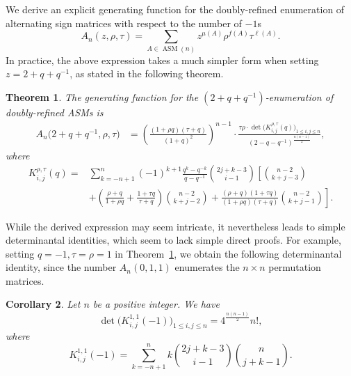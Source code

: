 \documentclass[12pt, a4paper]{amsart} %
\numberwithin{equation}{section}
\newtheorem{theorem}{Theorem}[section]
\newtheorem{corollary}[theorem]{Corollary}
\DeclareMathOperator{\ASM}{ASM}
\begin{document}
\medskip

We  derive an explicit  generating function for the doubly-refined enumeration of alternating sign matrices with respect to the number of $-1$s
\begin{equation}\label{def:An}
A_n(z,\rho,\tau) = \sum_{A\in \ASM(n)} z^{\mu(A)} \rho^{f(A)} \tau^{\ell(A)}.
\end{equation}
In practice, the above expression takes a much simpler form when setting $z=2+q+q^{-1}$, as stated in the following theorem.
\begin{theorem}\label{th:main}
The generating function  for 
the $(2+q+q^{-1})$-enumeration of doubly-refined ASMs is
\begin{align}\label{eq:An:main}
    A_n\bigl(2+q + q^{-1}, \rho, \tau\bigr)
        &= \left( \frac{(1 + \rho q)(\tau + q)}{(1 + q)^2} \right)^{\!n - 1} 
					 \cdot \frac{\tau \rho \cdot \det{\bigl(K^{\rho,\tau}_{i,j}(q)\bigr)_{1 \le i,j \le n}}}{(2 - q - q^{-1})^{\frac{n(n - 1)}{2}}},
\end{align}
    where
\begin{align*}
	K^{\rho,\tau}_{i,j}(q) = &\sum_{k=-n+1}^{n} (-1)^{k+1} \frac{q^k - q^{-k}}{q - q^{-1}} 
    \binom{2j + k - 3}{i - 1} \left[ \binom{n - 2}{k + j - 3} \right.  \\
    & \left. + \left( \frac{\rho + q}{1 + \rho q} + \frac{1 + \tau q}{\tau + q} \right) \binom{n - 2}{k + j - 2} 
     + \frac{(\rho + q)(1 + \tau q)}{(1 + \rho q)(\tau + q)} \binom{n - 2}{k + j - 1} \right].
\end{align*}      
    
\end{theorem}

While the derived expression may seem intricate, it nevertheless leads to simple determinantal identities, which seem to lack simple direct proofs.
For example, setting $q=-1, \tau=\rho=1$ in Theorem~\ref{th:main}, we obtain the following determinantal identity, 
since the number $A_n(0,1,1)$ enumerates the $n \times n$ permutation matrices.
\begin{corollary}\label{cor:n!}
Let $n$ be a positive integer. We have 
\begin{equation}\label{eq:n!}
	\det{\bigl(K^{1,1}_{i,j}(-1)\bigr)_{1 \le i,j \le n}}=4^{\frac{n(n-1)}{2}}n!,
\end{equation}
where
$$
	K^{1,1}_{i,j}(-1)=\sum_{k=-n+1}^{n}k\binom{2j+k-3}{i-1}\binom{n}{j+k-1}.
$$
\end{corollary}
\end{document}
